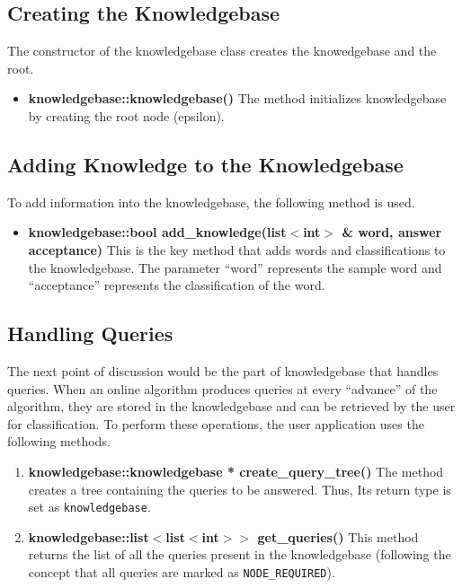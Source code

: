 \subsection*{Creating the Knowledgebase}
The constructor of the knowledgebase class creates the knowedgebase and the root.

\begin{itemize}
 \item \textbf{knowledgebase::knowledgebase()} \vskip 1pt
	The method initializes knowledgebase by creating the root node (epsilon).
\end{itemize}
	
\subsection*{Adding Knowledge to the Knowledgebase} 
To add information into the knowledgebase, the following method is used.
\begin{itemize}
\item \textbf{knowledgebase::bool add\_knowledge(list$<$int$>$ \& word, answer acceptance)} \vskip 1pt
This is the key method that adds words and classifications to the knowledgebase. The parameter ``word'' represents the sample word and ``acceptance'' represents the classification of the word. 
\end{itemize}	

\subsection*{Handling Queries}
The next point of discussion would be the part of knowledgebase that handles queries. When an online algorithm produces queries at every ``advance'' of the algorithm, they are stored in the knowledgebase and can be retrieved by the user for classification. To perform these operations, the user application uses the following methods.

\begin{enumerate}
\item \textbf{knowledgebase::knowledgebase * create\_query\_tree()} \vskip 1pt
The method creates a tree containing the queries to be answered. Thus, Its return type is set as \texttt{knowledgebase}.
	
\item \textbf{knowledgebase::list$<$list$<$int$>$$>$ get\_queries()} \vskip 1pt
This method returns the list of all the queries present in the knowledgebase (following the concept that all queries are marked as \texttt{NODE\_REQUIRED}). 
\end{enumerate}

